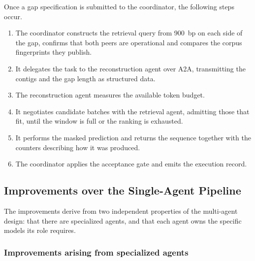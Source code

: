 Once a gap specification is submitted to the coordinator, the following steps occur.

\begin{enumerate}
    \item The coordinator constructs the retrieval query from 900~bp on each side of the gap,
    confirms that both peers are operational and compares the corpus fingerprints they publish.
    \item It delegates the task to the reconstruction agent over A2A, transmitting the contigs
    and the gap length as structured data.
    \item The reconstruction agent measures the available token budget.
    \item It negotiates candidate batches with the retrieval agent, admitting those that fit,
    until the window is full or the ranking is exhausted.
    \item It performs the masked prediction and returns the sequence together with the counters
    describing how it was produced.
    \item The coordinator applies the acceptance gate and emits the execution record.
\end{enumerate}

\subsection{Improvements over the Single-Agent Pipeline}
\label{subsec:mas-improvements}

The improvements derive from two independent properties of the multi-agent design: that there
are specialized agents, and that each agent owns the specific models its role requires.

\subsubsection{Improvements arising from specialized agents}

